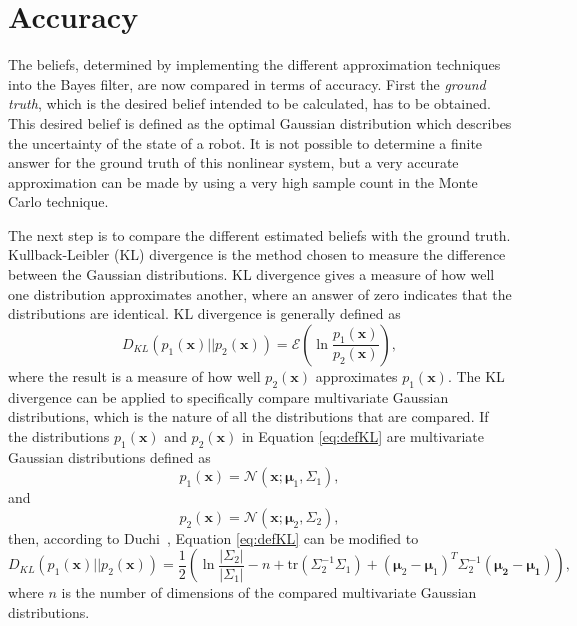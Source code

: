 \documentclass[12pt,oneside,openany,a4paper, %
afrikaans,english,
]{memoir}
\numberwithin{equation}{chapter}
\begin{document}
{\section{Accuracy}
The beliefs, determined by implementing the different approximation techniques into the Bayes filter, are now compared in terms of accuracy. First the \textit{ground truth}, which is the desired belief intended to be calculated, has to be obtained. This desired belief is defined as the optimal Gaussian distribution which describes the uncertainty of the state of a robot. It is not possible to determine a finite answer for the ground truth of this nonlinear system, but a very accurate approximation can be made by using a very high sample count in the Monte Carlo technique.

The next step is to compare the different estimated beliefs with the ground truth. Kullback-Leibler (KL) divergence is the method chosen to measure the difference between the Gaussian distributions. KL divergence gives a measure of how well one distribution approximates another, where an answer of zero indicates that the distributions are identical. KL divergence is generally defined as
\begin{equation}\label{eq:defKL}
D_{KL}(p_1(\bm{x})||p_2(\bm{x})) = \mathcal{E}\left(\ln\frac{p_1(\bm{x})}{p_2(\bm{x})}\right),
\end{equation}
where the result is a measure of how well $p_2(\bm{x})$ approximates $p_1(\bm{x})$.
The KL divergence can be applied to specifically compare multivariate Gaussian distributions, which is the nature of all the distributions that are compared. If the distributions $p_1(\bm{x})$ and $p_2(\bm{x})$  in Equation \ref{eq:defKL} are multivariate Gaussian distributions defined as
\begin{equation}
p_1(\bm{x})  = \mathcal{N}(\bm{x}; \bm{\mu}_1, \Sigma_1),
\end{equation}
and
\begin{equation}
p_2(\bm{x})  = \mathcal{N}(\bm{x}; \bm{\mu}_2, \Sigma_2),
\end{equation}
then, according to Duchi~\cite{duchi}, Equation \ref{eq:defKL} can be modified to
\begin{equation}\label{eq:klGauss}
D_{KL}(p_1(\bm{x})||p_2(\bm{x}))= \frac{1}{2}\left(\ln\frac{|\Sigma_2|}{|\Sigma_1|} - n + \text{tr}\left(\Sigma_2^{-1}\Sigma_1\right) + (\bm{\mu}_2 - \bm{\mu}_1)^T \Sigma_2^{-1} (\bm{\mu_2}-\bm{\mu_1})\right),
\end{equation}
where $n$ is the number of dimensions of the compared multivariate Gaussian distributions.

}
\end{document}
